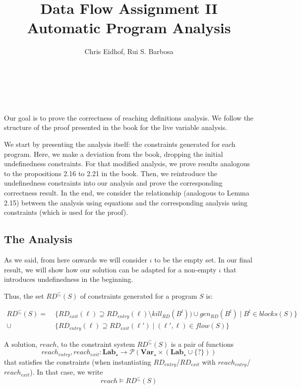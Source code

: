 \documentclass[a4wide,12pt]{article}
\theoremstyle{definition}
\theoremstyle{plain}
\theoremstyle{remark}
\def\pset#1{\mathcal{P}(#1)}
\def\Lab {\mathbf{Lab}}
\def\Var {\mathbf{Var}}
\begin{document}
\author{Chris Eidhof, Rui S. Barbosa}
\title{Data Flow Assignment II \\ Automatic Program Analysis}
 
\maketitle

\section{~}

Our goal is to prove the correctness of reaching definitions analysis.
We follow the structure of the proof presented in the book for the live
variable analysis.

We start by presenting the analysis itself: the constraints generated for each program. Here,
we make a deviation from the book, dropping the initial undefinedness constraints. For that
modified analysis, we prove results analogous to the propositions 2.16 to 2.21 in the book.
Then, we reintroduce the undefinedness constraints into our analysis and prove the corresponding
correctness result. In the end, we consider the relationship (analogous to Lemma 2.15)
between the analysis using equations and
the corresponding analysis using constraints (which is used for the proof).

\subsection*{The Analysis}

As we said, from here onwards we will consider $\iota$ to be the empty set. In our final result, we
will show how our solution can be adapted for a non-empty $\iota$ that introduces
undefinedness in the beginning.

Thus, the set $RD^\subseteq(S)$ of constraints generated for a program $S$ is:

\begin{align*} 
\label{def_constr}
RD^{\subseteq}(S) = & \; \{RD_{exit}(\ell) \supseteq RD_{entry}(\ell) \setminus kill_{RD}(B^l)) \cup gen_{RD}(B^l) \mid B^l \in blocks(S)\} \\
\cup & \; \{RD_{entry}(\ell) \supseteq RD_{exit}(\ell') \mid (\ell', \ell) \in flow(S) \}
\end{align*}

A solution, $reach$, to the constraint system $RD^\subseteq(S)$ is a pair of functions
\[reach_{entry}, reach_{exit} : \Lab_\star \to \pset{\Var_\star \times (\Lab_\star \cup \{?\})}\] 
that satisfies the constraints (when instantiating $RD_{entry}$/$RD_{exit}$ with $reach_{entry}$/$reach_{exit}$).
In that case, we write
\[reach \models RD^{\subseteq}(S)\]
\end{document}
